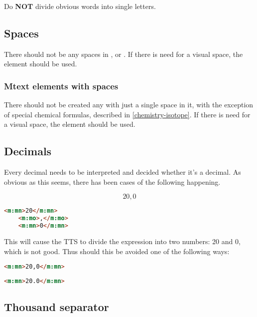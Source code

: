 \documentclass[english,a4paper,11pt]{article}
\begin{document}
Do \textbf{NOT} divide obvious words into single letters.

\subsection{Spaces}

There should not be any spaces in ,  or . If there is need for a visual space, the element  should be used.

\subsubsection{Mtext elements with spaces}

There should not be created any  with just a single space in it, with the exception of special chemical formulas, described in \ref{chemistry-isotope}. If there is need for a visual space, the element  should be used.

\subsection{Decimals}

Every decimal needs to be interpreted and decided whether it's a decimal. As obvious as this seems, there has been cases of the following happening.

\begin{examples}
\begin{equation}
	20,0
\end{equation}
\begin{lstlisting}[language=HTML, caption={\textbf{Invalid markup}}]
	<m:mn>20</m:mn>
	<m:mo>,</m:mo>
	<m:mn>0</m:mn>
\end{lstlisting}

This will cause the TTS to divide the expression into two numbers: 20 and 0, which is not good. Thus should this be avoided one of the following ways:
\begin{lstlisting}[language=HTML, caption={Valid markup 1}]
	<m:mn>20,0</m:mn>
\end{lstlisting}
\begin{lstlisting}[language=HTML, caption={Valid markup 2}]
	<m:mn>20.0</m:mn>
\end{lstlisting}
\end{examples}

\subsection{Thousand separator}
\end{document}
